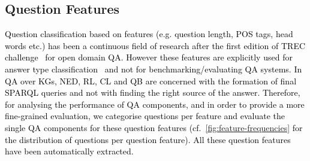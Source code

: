\documentclass[sigconf,edbt]{acmart-edbt2019}
\begin{document}
\subsection{Question Features} \label{sec:feature}
\textcolor{black}{Question classification based on features (e.g. question length, POS tags, head words etc.) has been a continuous field of research after the first edition of TREC challenge~\cite{voorhees2000overview} for open domain QA. However these features are explicitly used for answer type classification~\cite{DBLP:conf/emnlp/HuangTC09} and not for benchmarking/evaluating QA systems. In QA over KGs, NED, RL, CL and QB are concerned with the formation of final SPARQL queries and not with finding the right source of the answer. Therefore, for analysing the performance of QA components, and in order to provide a more fine-grained evaluation, we categorise questions per feature and evaluate the single QA components for these question features (cf.\ \autoref{fig:feature-frequencies} for the distribution of questions per question feature). All these question features have been automatically extracted.}
\end{document}
